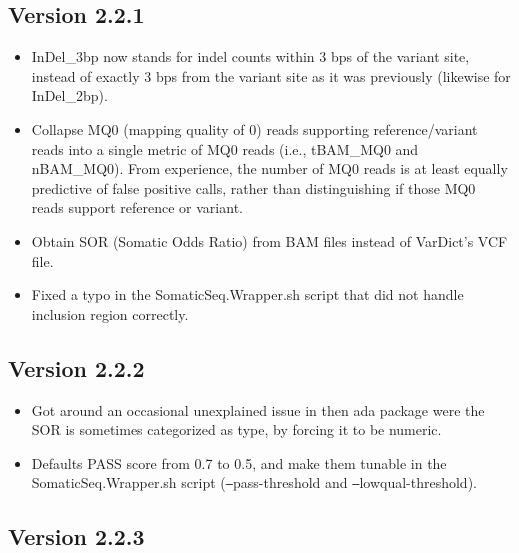 \documentclass[10pt,letterpaper]{article}
\begin{document}
\begin{sloppypar}
\subsection{Version 2.2.1}

\begin{itemize}

  \item
  InDel\_3bp now stands for indel counts within 3 bps of the variant site, instead of exactly 3 bps from the variant site as it was previously (likewise for InDel\_2bp). 
 
  \item
  Collapse MQ0 (mapping quality of 0) reads supporting reference/variant reads into a single metric of MQ0 reads (i.e., tBAM\_MQ0 and nBAM\_MQ0). From experience, the number of MQ0 reads is at least equally predictive of false positive calls, rather than distinguishing if those MQ0 reads support reference or variant. 
  
  \item
  Obtain SOR (Somatic Odds Ratio) from BAM files instead of VarDict's VCF file.
  
  \item
  Fixed a typo in the SomaticSeq.Wrapper.sh script that did not handle inclusion region correctly.
  
\end{itemize}



\subsection{Version 2.2.2}

\begin{itemize}

  \item
  Got around an occasional unexplained issue in then ada package were the SOR is sometimes categorized as type, by forcing it to be numeric. 
  
  \item
  Defaults PASS score from 0.7 to 0.5, and make them tunable in the SomaticSeq.Wrapper.sh script (\texttt{--}pass-threshold and \texttt{--}lowqual-threshold). 
  
\end{itemize}



\subsection{Version 2.2.3}


\end{sloppypar}
\end{document}
